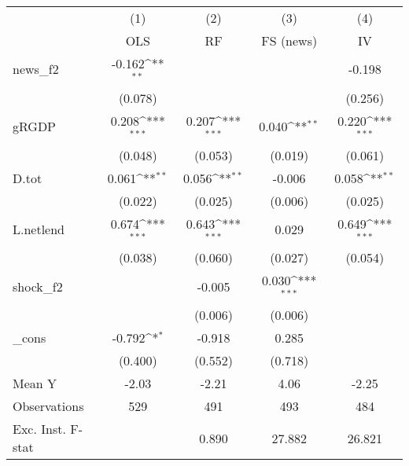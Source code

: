 {
\def\sym#1{\ifmmode^{#1}\else\(^{#1}\)\fi}
\begin{tabular}{l*{4}{c}}
\toprule
            &\multicolumn{1}{c}{(1)}&\multicolumn{1}{c}{(2)}&\multicolumn{1}{c}{(3)}&\multicolumn{1}{c}{(4)}\\
            &\multicolumn{1}{c}{OLS}&\multicolumn{1}{c}{RF}&\multicolumn{1}{c}{FS (news)}&\multicolumn{1}{c}{IV}\\
\midrule
news\_f2     &      -0.162\sym{**} &                     &                     &      -0.198         \\
            &     (0.078)         &                     &                     &     (0.256)         \\
\addlinespace
gRGDP       &       0.208\sym{***}&       0.207\sym{***}&       0.040\sym{**} &       0.220\sym{***}\\
            &     (0.048)         &     (0.053)         &     (0.019)         &     (0.061)         \\
\addlinespace
D.tot       &       0.061\sym{**} &       0.056\sym{**} &      -0.006         &       0.058\sym{**} \\
            &     (0.022)         &     (0.025)         &     (0.006)         &     (0.025)         \\
\addlinespace
L.netlend   &       0.674\sym{***}&       0.643\sym{***}&       0.029         &       0.649\sym{***}\\
            &     (0.038)         &     (0.060)         &     (0.027)         &     (0.054)         \\
\addlinespace
shock\_f2    &                     &      -0.005         &       0.030\sym{***}&                     \\
            &                     &     (0.006)         &     (0.006)         &                     \\
\addlinespace
\_cons      &      -0.792\sym{*}  &      -0.918         &       0.285         &                     \\
            &     (0.400)         &     (0.552)         &     (0.718)         &                     \\
\midrule
Mean Y      &       -2.03         &       -2.21         &        4.06         &       -2.25         \\
Observations&         529         &         491         &         493         &         484         \\
Exc. Inst. F-stat&                     &       0.890         &      27.882         &      26.821         \\
\bottomrule
\end{tabular}
}
